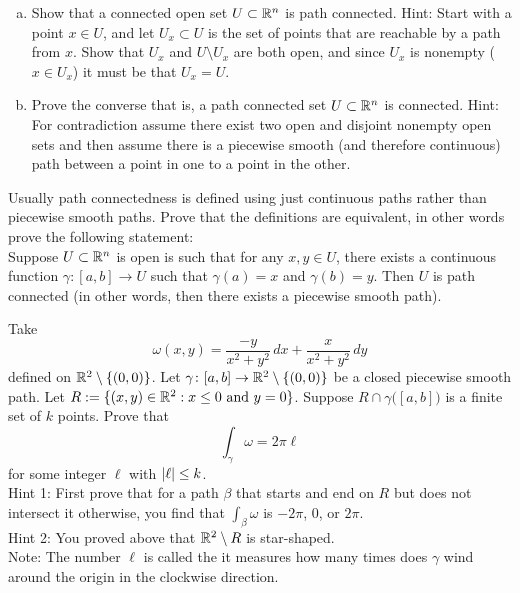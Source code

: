 \pagebreak[2]
\begin{exercise}
\leavevmode
\begin{enumerate}[a)]
\item
Show that a connected open set $U \subset {\mathbb{R}}^n$ is path connected.
Hint: Start with a
point $x \in U$, and let $U_x \subset U$ is the set of points that are
reachable by a path from $x$.  Show that $U_x$ and $U \setminus U_x$
are both open, and since $U_x$ is nonempty ($x \in U_x$) it must be
that $U_x = U$.
\item
Prove the converse that is, a path connected set $U \subset {\mathbb{R}}^n$ is
connected.  Hint: For contradiction assume there exist two open and disjoint nonempty open
sets and then assume there is a piecewise smooth (and therefore continuous)
path between a point in one to a point in the other.
\end{enumerate}
\end{exercise}

\begin{exercise}
Usually path connectedness is defined using just continuous paths rather
than piecewise smooth paths.  Prove that the definitions are equivalent, in
other words prove the following statement:\\
Suppose $U \subset {\mathbb{R}}^n$ is open is such that for any $x,y \in U$, there exists a continuous function
$\gamma \colon [a,b] \to U$ such that $\gamma(a) = x$ and $\gamma(b) = y$.
Then $U$ is path connected (in other words, then there exists a piecewise
smooth path).
\end{exercise}

\begin{exercise}[Hard]
Take
\begin{equation*}
\omega(x,y) = \frac{-y}{x^2+y^2} \, dx + \frac{x}{x^2+y^2} \, dy
\end{equation*}
defined on ${\mathbb{R}}^2 \setminus \{ (0,0) \}$.  Let $\gamma \colon [a,b] \to {\mathbb{R}}^2
\setminus \{ (0,0) \}$ be a closed piecewise smooth path.
Let $R:=\{ (x,y) \in {\mathbb{R}}^2 : x \leq 0 \text{ and } y=0 \}$.
Suppose $R \cap \gamma\bigl([a,b]\bigr)$ is a finite set of $k$ points.
Prove that
\begin{equation*}
\int_{\gamma} \omega = 2 \pi \ell 
\end{equation*}
for some integer $\ell$ with $\left\lvert {\ell} \right\rvert \leq k$.\\
Hint 1: First prove that for a path $\beta$ that starts and end on $R$ but
does not intersect it otherwise, you find that $\int_{\beta} \omega$
is $-2\pi$, 0, or $2\pi$.
\\
Hint 2: You proved above that ${\mathbb{R}}^2 \setminus R$ is star-shaped.
\\
Note: The number $\ell$ is called the \emph{} it measures how many
times does $\gamma$ wind around the origin in the clockwise direction.
\end{exercise}
